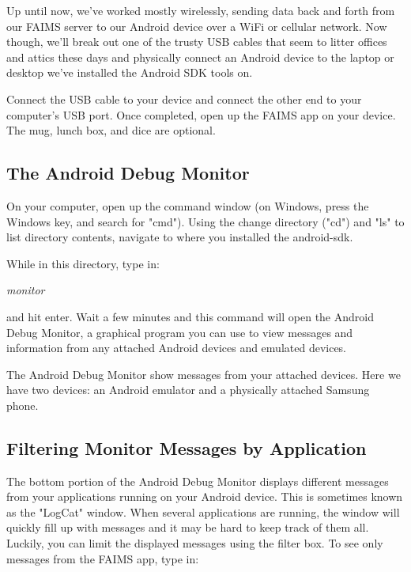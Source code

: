 Up until now, we've worked mostly wirelessly, sending data back and forth from our FAIMS server to our Android device over a WiFi or cellular network. Now though, we'll break out one of the trusty USB cables that seem to litter offices and attics these days and physically connect an Android device to the laptop or desktop we've installed the Android SDK tools on.

{}

Connect the USB cable to your device and connect the other end to your computer's USB port. Once completed, open up the FAIMS app on your device. The mug, lunch box, and dice are optional.

\subsection[the-android-debug-monitor]{The Android Debug Monitor}

On your computer, open up the command window (on Windows, press the Windows key, and search for "cmd"). Using the change directory ("cd") and "ls" to list directory contents, navigate to where you installed the android-sdk.

{}

While in this directory, type in:

{\em monitor}

and hit enter. Wait a few minutes and this command will open the Android Debug Monitor, a graphical program you can use to view messages and information from any attached Android devices and emulated devices.

{}

The Android Debug Monitor show messages from your attached devices. Here we have two devices: an Android emulator and a physically attached Samsung phone.

\subsection[filtering-monitor-messages-by-application]{Filtering Monitor Messages by Application}

The bottom portion of the Android Debug Monitor displays different messages from your applications running on your Android device. This is sometimes known as the "LogCat" window. When several applications are running, the window will quickly fill up with messages and it may be hard to keep track of them all. Luckily, you can limit the displayed messages using the filter box. To see only messages from the FAIMS app, type in:

